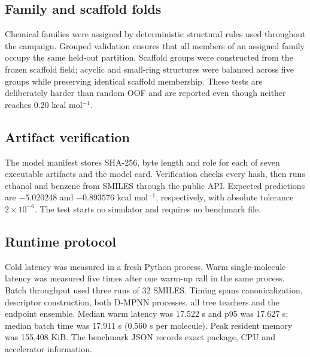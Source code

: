 \documentclass[10pt]{article}
\begin{document}
\subsection*{Family and scaffold folds}

Chemical families were assigned by deterministic structural rules used throughout the campaign. Grouped validation ensures that all members of an assigned family occupy the same held-out partition. Scaffold groups were constructed from the frozen scaffold field; acyclic and small-ring structures were balanced across five groups while preserving identical scaffold membership. These tests are deliberately harder than random OOF and are reported even though neither reaches 0.20 kcal mol$^{-1}$.

\subsection*{Artifact verification}

The model manifest stores SHA-256, byte length and role for each of seven executable artifacts and the model card. Verification checks every hash, then runs ethanol and benzene from SMILES through the public API. Expected predictions are $-5.020248$ and $-0.893576$ kcal mol$^{-1}$, respectively, with absolute tolerance $2\times10^{-6}$. The test starts no simulator and requires no benchmark file.

\subsection*{Runtime protocol}

Cold latency was measured in a fresh Python process. Warm single-molecule latency was measured five times after one warm-up call in the same process. Batch throughput used three runs of 32 SMILES. Timing spans canonicalization, descriptor construction, both D-MPNN processes, all tree teachers and the endpoint ensemble. Median warm latency was 17.522 s and p95 was 17.627 s; median batch time was 17.911 s (0.560 s per molecule). Peak resident memory was 155,408 KiB. The benchmark JSON records exact package, CPU and accelerator information.
\end{document}
